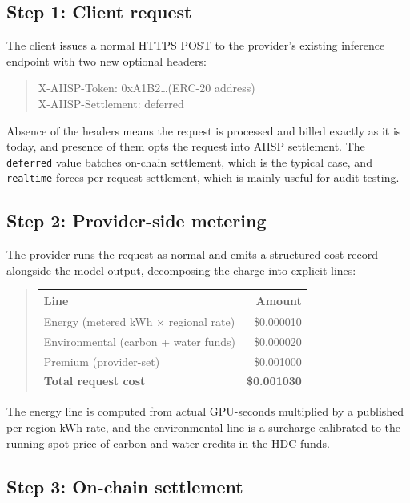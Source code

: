 \documentclass[10pt,a4paper,twocolumn]{article}
\begin{document}
\subsection*{Step 1: Client request}

The client issues a normal HTTPS POST to the provider's existing inference endpoint with two new optional headers:

\begin{quote}\scriptsize\ttfamily
X-AIISP-Token: 0xA1B2\ldots (ERC-20 address)\\
X-AIISP-Settlement: deferred
\end{quote}

\noindent Absence of the headers means the request is processed and billed exactly as it is today, and presence of them opts the request into AIISP settlement. The \texttt{deferred} value batches on-chain settlement, which is the typical case, and \texttt{realtime} forces per-request settlement, which is mainly useful for audit testing.

\subsection*{Step 2: Provider-side metering}

The provider runs the request as normal and emits a structured cost record alongside the model output, decomposing the charge into explicit lines:

\begin{quote}\footnotesize
\begin{tabular}{@{}lr@{}}
\toprule
Line & Amount \\
\midrule
Energy (metered kWh $\times$ regional rate) & \$0.000010 \\
Environmental (carbon + water funds)        & \$0.000020 \\
Premium (provider-set)                      & \$0.001000 \\
\midrule
\textbf{Total request cost}                 & \textbf{\$0.001030} \\
\bottomrule
\end{tabular}
\end{quote}

The energy line is computed from actual GPU-seconds multiplied by a published per-region kWh rate, and the environmental line is a surcharge calibrated to the running spot price of carbon and water credits in the HDC funds.

\subsection*{Step 3: On-chain settlement}
\end{document}
